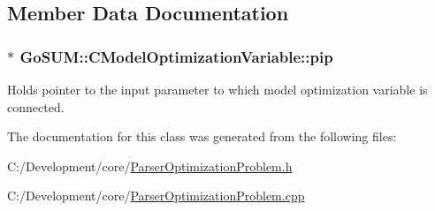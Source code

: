 \subsection{Member Data Documentation}
\hypertarget{class_go_s_u_m_1_1_c_model_optimization_variable_ab1f22680bcb939d871b717126ea555f1}{
\subsubsection[{pip}]{$\ast$ Go\-S\-U\-M\-::\-C\-Model\-Optimization\-Variable\-::pip\hspace{0.3cm}{\ttfamily [protected]}}}\label{class_go_s_u_m_1_1_c_model_optimization_variable_ab1f22680bcb939d871b717126ea555f1}
Holds pointer to the input parameter to which model optimization variable is connected. 

The documentation for this class was generated from the following files\-:\begin{DoxyCompactItemize}
\item 
C\-:/\-Development/core/\hyperlink{_parser_optimization_problem_8h}{Parser\-Optimization\-Problem.\-h}\item 
C\-:/\-Development/core/\hyperlink{_parser_optimization_problem_8cpp}{Parser\-Optimization\-Problem.\-cpp}\end{DoxyCompactItemize}
